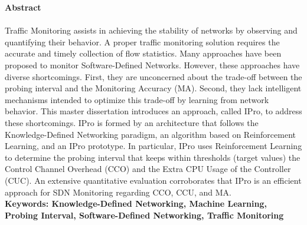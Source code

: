 \textbf{\LARGE Abstract}\\\\
Traffic Monitoring assists in achieving the stability of networks by observing and quantifying their behavior. A proper traffic monitoring solution requires the accurate and timely collection of flow statistics. Many approaches have been proposed to monitor Software-Defined Networks. However, these approaches have diverse shortcomings. First, they are unconcerned about the trade-off between the probing interval and the Monitoring Accuracy (MA). Second, they lack intelligent mechanisms intended to optimize this trade-off by learning from network behavior. This master dissertation introduces an approach, called IPro, to address these shortcomings. IPro is formed by an architecture that follows the Knowledge-Defined Networking paradigm, an algorithm based on Reinforcement Learning, and an IPro prototype. In particular, IPro uses Reinforcement Learning to determine the probing interval that keeps within thresholds (target values) the Control Channel Overhead (CCO) and the Extra CPU Usage of the Controller (CUC). An extensive quantitative evaluation corroborates that IPro is an efficient approach for SDN Monitoring regarding CCO, CCU, and MA.\\[2.0cm]


\textbf{\small Keywords: Knowledge-Defined Networking, Machine Learning, Probing Interval, Software-Defined Networking, Traffic Monitoring}\\